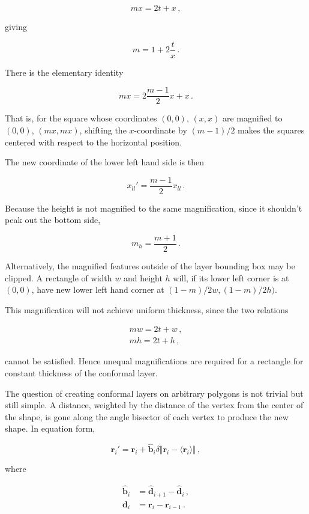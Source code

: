 \documentclass{article}
\begin{document}
$$ m x = 2t + x\,, $$

giving

$$ m = 1 + 2 \frac tx \,.$$

There is the elementary identity

$$mx = 2 \frac{m-1}{2} x + x \,. $$

That is, for the square whose coordinates $(0,0)$, $(x,x)$ are magnified to $(0,0)$, $(mx,mx)$, shifting the $x$-coordinate by $(m-1)/2$ makes the squares centered with respect to the horizontal position.

The new coordinate of the lower left hand side is then 

$$x_{ll}' = \frac{m-1}{2} x_{ll} \,. $$

Because the height is not magnified to the same magnification, since it shouldn't peak out the bottom side,

$$m_h = \frac{m+1}{2} \,. $$

Alternatively, the magnified features outside of the layer bounding box may be clipped. A rectangle of width $w$ and height $h$ will, if its lower left corner is at $(0,0)$, have new lower left hand corner at $(1-m)/2 w, (1-m)/2 h)$.

This magnification will not achieve uniform thickness, since the two relations

\begin{align*}
    mw = 2t + w \,,\\
    mh = 2t + h \,,
\end{align*}

cannot be satisfied. Hence unequal magnifications are required for a rectangle for constant thickness of the conformal layer. 

The question of creating conformal layers on arbitrary polygons is not trivial but still simple. A distance, weighted by the distance of the vertex from the center of the shape, is gone along the angle bisector of each vertex to produce the new shape. In equation form,

$$\mathbf{r}_i' = \mathbf{r}_i + \hat{\mathbf{b}}_i \delta \Vert \mathbf{r}_i - \langle \mathbf{r}_i \rangle \Vert \,, $$

where

\begin{align*}
\hat{\mathbf{b}}_i &= \hat{\mathbf{d}}_{i+1} - \hat{\mathbf{d}}_{i}\,, \\
\mathbf{d}_i &= \mathbf{r}_i - \mathbf{r}_{i-1} \,.
\end{align*}
\end{document}
